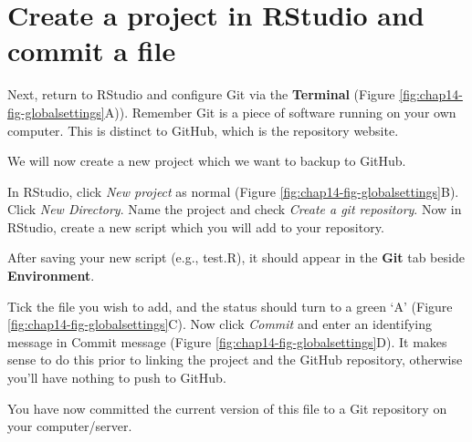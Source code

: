 \documentclass[
  12pt,
  krantz2]{krantz}
\begin{document}
\hypertarget{create-a-project-in-rstudio-and-commit-a-file}{%
\section{Create a project in RStudio and commit a file}\label{create-a-project-in-rstudio-and-commit-a-file}}


Next, return to RStudio and configure Git via the \textbf{Terminal} (Figure \ref{fig:chap14-fig-globalsettings}A)).
Remember Git is a piece of software running on your own computer.
This is distinct to GitHub, which is the repository website.

We will now create a new project which we want to backup to GitHub.

In RStudio, click \emph{New project} as normal (Figure \ref{fig:chap14-fig-globalsettings}B).
Click \emph{New Directory}.
Name the project and check \emph{Create a git repository}.
Now in RStudio, create a new script which you will add to your repository.

After saving your new script (e.g., test.R), it should appear in the \textbf{Git} tab beside \textbf{Environment}.

Tick the file you wish to add, and the status should turn to a green `A' (Figure \ref{fig:chap14-fig-globalsettings}C).
Now click \emph{Commit} and enter an identifying message in Commit message (Figure \ref{fig:chap14-fig-globalsettings}D).
It makes sense to do this prior to linking the project and the GitHub repository, otherwise you'll have nothing to push to GitHub.

You have now committed the current version of this file to a Git repository on your computer/server.
\end{document}
